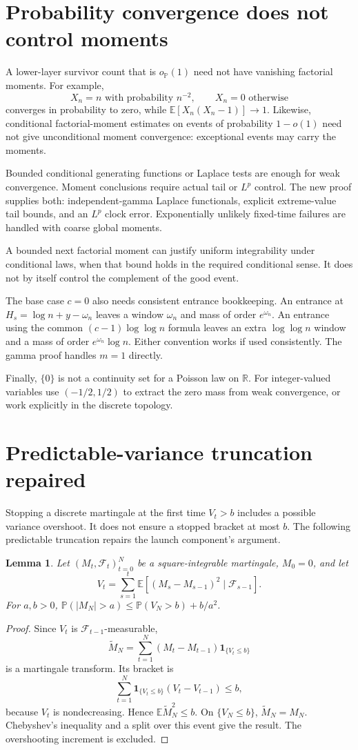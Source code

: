 \documentclass[11pt]{article}
\newtheorem{lemma}{Lemma}
\newcommand{\Pbb}{\mathbb P}
\newcommand{\Ebb}{\mathbb E}
\begin{document}
\section{Probability convergence does not control moments}
A lower-layer survivor count that is $o_{\Pbb}(1)$ need not have vanishing
factorial moments. For example,
\[
 X_n=n\text{ with probability }n^{-2},\qquad X_n=0\text{ otherwise}
\]
converges in probability to zero, while
$\Ebb[X_n(X_n-1)]\to1$. Likewise, conditional factorial-moment estimates
on events of probability $1-o(1)$ need not give unconditional moment
convergence: exceptional events may carry the moments.

Bounded conditional generating functions or Laplace tests are enough for
weak convergence. Moment conclusions require actual tail or $L^p$ control.
The new proof supplies both: independent-gamma Laplace functionals, explicit
extreme-value tail bounds, and an $L^p$ clock error. Exponentially unlikely
fixed-time failures are handled with coarse global moments.

A bounded next factorial moment can justify uniform integrability under
conditional laws, when that bound holds in the required conditional sense.
It does not by itself control the complement of the good event.

The base case $c=0$ also needs consistent entrance bookkeeping. An entrance
at $H_s=\log n+y-\omega_n$ leaves a window $\omega_n$ and mass of order
$e^{\omega_n}$. An entrance using the common $(c-1)\log\log n$ formula
leaves an extra $\log\log n$ window and a mass of order
$e^{\omega_n}\log n$. Either convention works if used consistently.
The gamma proof handles $m=1$ directly.

Finally, $\{0\}$ is not a continuity set for a Poisson law on $\mathbb R$.
For integer-valued variables use $(-1/2,1/2)$ to extract the zero mass from
weak convergence, or work explicitly in the discrete topology.

\section{Predictable-variance truncation repaired}
Stopping a discrete martingale at the first time $V_t>b$ includes a possible
variance overshoot. It does not ensure a stopped bracket at most $b$.
The following predictable truncation repairs the launch component's argument.

\begin{lemma}\label{lem:variance}
Let $(M_t,\mathcal F_t)_{t=0}^N$ be a square-integrable martingale, $M_0=0$,
and let
\[
 V_t=\sum_{s=1}^t\Ebb[(M_s-M_{s-1})^2\mid\mathcal F_{s-1}].
\]
For $a,b>0$, $\Pbb(|M_N|>a)\le\Pbb(V_N>b)+b/a^2$.
\end{lemma}
\begin{proof}
Since $V_t$ is $\mathcal F_{t-1}$-measurable,
\[
 \widetilde M_N=\sum_{t=1}^N(M_t-M_{t-1})\mathbf1_{\{V_t\le b\}}
\]
is a martingale transform. Its bracket is
\[
 \sum_{t=1}^N\mathbf1_{\{V_t\le b\}}(V_t-V_{t-1})\le b,
\]
because $V_t$ is nondecreasing. Hence $\Ebb\widetilde M_N^2\le b$.
On $\{V_N\le b\}$, $\widetilde M_N=M_N$. Chebyshev's inequality and a
split over this event give the result. The overshooting increment is excluded.
\end{proof}
\end{document}
